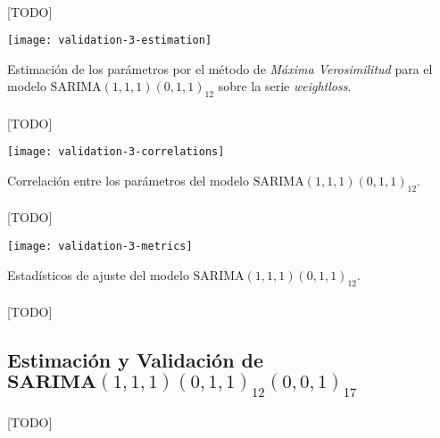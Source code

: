 \documentclass[a4paper, spanish]{article}
\begin{document}
      \paragraph{}
      [TODO]

      \begin{table}[htb!]
        \centering
        \texttt{[image: validation-3-estimation]}
        \caption{Estimación de los parámetros por el método de \emph{Máxima Verosimilitud} para el modelo $\text{SARIMA}(1, 1, 1)(0, 1, 1)_{12}$ sobre la serie \emph{weightloss}.}
        \label{table:validation_3_estimation}
      \end{table}

      \paragraph{}
      [TODO]

      \begin{table}[htb!]
        \centering
        \texttt{[image: validation-3-correlations]}
        \caption{Correlación entre los parámetros del modelo $\text{SARIMA}(1, 1, 1)(0, 1, 1)_{12}$.}
        \label{table:validation_3_correlations}
      \end{table}

      \paragraph{}
      [TODO]

      \begin{table}[htb!]
        \centering
        \texttt{[image: validation-3-metrics]}
        \caption{Estadísticos de ajuste del modelo $\text{SARIMA}(1, 1, 1)(0, 1, 1)_{12}$.}
        \label{img:validation_3_metrics}
      \end{table}

      \paragraph{}
      [TODO]

    \subsection{Estimación y Validación de $\textbf{SARIMA}(1, 1, 1)(0, 1, 1)_{12}(0, 0, 1)_{17}$}
    \label{sec:fitting_4}

      \paragraph{}
      [TODO]
\end{document}
